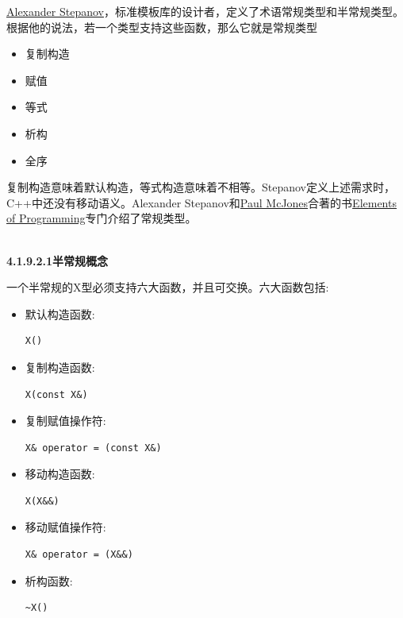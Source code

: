 \begin{tcolorbox}[breakable,enhanced jigsaw,colback=blue!5!white,colframe=blue!75!black,title={常规类型}]

\href{https://en.wikipedia.org/wiki/Alexander_Stepanov}{Alexander Stepanov}，标准模板库的设计者，定义了术语常规类型和半常规类型。根据他的说法，若一个类型支持这些函数，那么它就是常规类型

\begin{itemize}
\item
复制构造

\item
赋值

\item
等式

\item
析构

\item
全序
\end{itemize}

复制构造意味着默认构造，等式构造意味着不相等。Stepanov定义上述需求时，C++中还没有移动语义。Alexander Stepanov和\href{https://www.mcjones.org/paul/}{Paul McJones}合著的书\href{http://elementsofprogramming.com/}{Elements of Programming}专门介绍了常规类型。

\end{tcolorbox}

\hspace*{\fill} \\ %
\noindent
\textbf{4.1.9.2.1\hspace{0.2cm}半常规概念}

一个半常规的X型必须支持六大函数，并且可交换。六大函数包括:

\begin{itemize}
\item
默认构造函数:
\begin{lstlisting}[style=styleCXX]
X()
\end{lstlisting}

\item
复制构造函数:
\begin{lstlisting}[style=styleCXX]
X(const X&)
\end{lstlisting}

\item
复制赋值操作符:
\begin{lstlisting}[style=styleCXX]
X& operator = (const X&)
\end{lstlisting}

\item
移动构造函数:
\begin{lstlisting}[style=styleCXX]
X(X&&)
\end{lstlisting}

\item
移动赋值操作符:
\begin{lstlisting}[style=styleCXX]
X& operator = (X&&)
\end{lstlisting}

\item
析构函数:
\begin{lstlisting}[style=styleCXX]
~X()
\end{lstlisting}
\end{itemize}

